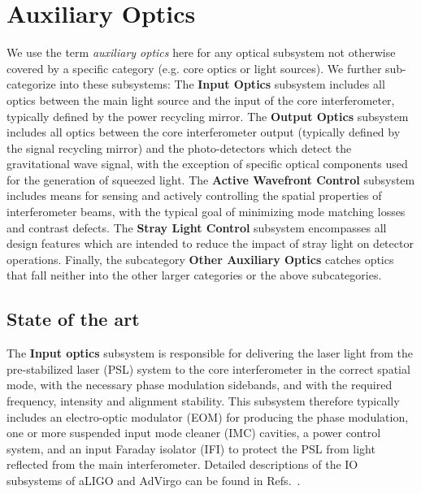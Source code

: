 \chapter{Auxiliary Optics}
\label{sec:Aux-optics}

\begin{samepage} %

We use the term \emph{auxiliary optics} here for any optical subsystem not otherwise covered by a specific category (e.g. core optics or light sources). We further sub-categorize into these subsystems:
The {\bf Input Optics} subsystem includes all optics between the main light source and the input of the core interferometer, typically defined by the power recycling mirror. The {\bf Output Optics} subsystem includes all optics between the core interferometer output (typically defined by the signal recycling mirror) and the photo-detectors which detect the gravitational wave signal, with the exception of specific optical components used for the generation of squeezed light. The {\bf Active Wavefront Control} subsystem includes means for sensing and actively controlling the spatial properties of interferometer beams, with the typical goal of minimizing mode matching losses and contrast defects. The {\bf Stray Light Control} subsystem encompasses all design features which are intended to reduce the impact of stray light on detector operations. Finally, the subcategory {\bf Other Auxiliary Optics} catches optics that fall neither into the other larger categories or the above 
subcategories.

\section{State of the art}
The {\bf Input optics} subsystem is responsible for delivering the laser light from the pre-stabilized laser (PSL) system to the core interferometer in the correct spatial mode, with the necessary phase modulation sidebands, and with the required frequency, intensity and alignment stability. This subsystem therefore typically includes an electro-optic modulator (EOM) for producing the phase modulation, one or more suspended input mode cleaner (IMC) cavities, a power control system, and an input Faraday isolator (IFI) to protect the PSL from light reflected from the main interferometer. Detailed descriptions of the IO subsystems of aLIGO and AdVirgo can be found in Refs.~\cite{aLIGO_IO,IOchapter}. 

\end{samepage} %

